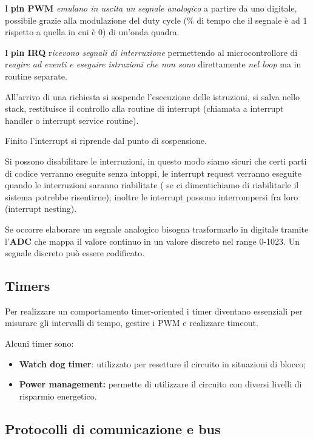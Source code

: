 I \textbf{pin PWM} \emph{emulano in uscita un segnale analogico} a
partire da uno digitale, possibile grazie alla modulazione del duty
cycle (\% di tempo che il segnale è ad 1 rispetto a quella in cui è 0)
di un'onda quadra.

I \textbf{pin IRQ} r\emph{icevono segnali di interruzione} permettendo
al microcontrollore di r\emph{eagire ad eventi e eseguire istruzioni che
non sono} direttamente \emph{nel loop} ma in routine separate.

All'arrivo di una richiesta si sospende l'esecuzione delle istruzioni,
si salva nello stack, restituisce il controllo alla routine di interrupt
(chiamata a interrupt handler o interrupt service routine).

Finito l'interrupt si riprende dal punto di sospensione.

Si possono disabilitare le interruzioni, in questo modo siamo sicuri che
certi parti di codice verranno eseguite senza intoppi, le interrupt
request verranno eseguite quando le interruzioni saranno riabilitate (
se ci dimentichiamo di riabilitarle il sistema potrebbe risentirne);
inoltre le interrupt possono interrompersi fra loro (interrupt nesting).

Se occorre elaborare un segnale analogico bisogna trasformarlo in
digitale tramite l'\textbf{ADC} che mappa il valore continuo in un
valore discreto nel range 0-1023. Un segnale discreto può essere
codificato.

\subsection{Timers}\label{timers}

Per realizzare un comportamento timer-oriented i timer diventano
essenziali per misurare gli intervalli di tempo, gestire i PWM e
realizzare timeout.

Alcuni timer sono:

\begin{itemize}
\item
  \textbf{Watch dog timer}: utilizzato per resettare il circuito in
  situazioni di blocco;
\item
  \textbf{Power management:} permette di utilizzare il circuito con
  diversi livelli di risparmio energetico.
\end{itemize}

\subsection{Protocolli di comunicazione e
bus}\label{protocolli-di-comunicazione-e-bus}


